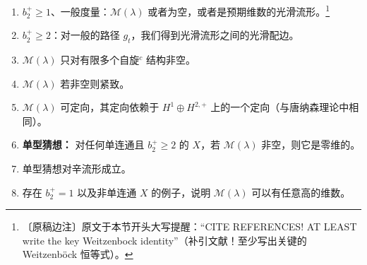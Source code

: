 \begin{enumerate}[label=\arabic*., leftmargin=2.1em]
\item $b_{2}^{+}\ge1$、一般度量：$\mathcal{M}(\lambda)$ 或者为空，或者是预期维数的光滑流形。\footnote{〔原稿边注〕原文于本节开头大写提醒：“CITE REFERENCES! AT LEAST write the key Weitzenbock identity”（补引文献！至少写出关键的 Weitzenböck 恒等式）。}

\item $b_{2}^{+}\ge2$：对一般的路径 $g_{t}$，我们得到光滑流形之间的光滑配边。

\item $\mathcal{M}(\lambda)$ 只对有限多个自旋$^{c}$ 结构非空。

\item $\mathcal{M}(\lambda)$ 若非空则紧致。

\item $\mathcal{M}(\lambda)$ 可定向，其定向依赖于 $H^{1}\oplus H^{2,+}$ 上的一个定向（与唐纳森理论中相同）。

\item \textbf{单型猜想：} 对任何单连通且 $b_{2}^{+}\ge2$ 的 $X$，若 $\mathcal{M}(\lambda)$ 非空，则它是零维的。

\item 单型猜想对辛流形成立。

\item 存在 $b_{2}^{+}=1$ 以及非单连通 $X$ 的例子，说明 $\mathcal{M}(\lambda)$ 可以有任意高的维数。
\end{enumerate}




